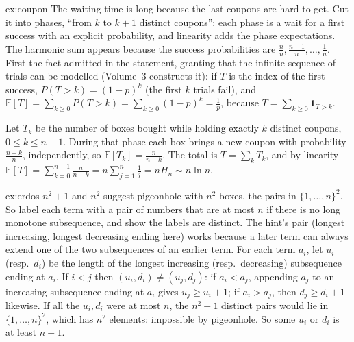 \begin{solution}{ex:coupon}
\idea The waiting time is long because the last coupons are hard to get. Cut it into phases, ``from $k$ to $k+1$ distinct coupons'': each phase is a wait for a first success with an explicit probability, and linearity adds the phase expectations. The harmonic sum appears because the success probabilities are $\frac nn,\frac{n-1}n,\dots,\frac1n$.
\writeup First the fact admitted in the statement, granting that the infinite sequence of trials can be modelled (Volume~3 constructs it): if $T$ is the index of the first success, $P(T>k)=(1-p)^k$ (the first $k$ trials fail), and $\mathbb E[T]=\sum_{k\ge0}P(T>k)=\sum_{k\ge0}(1-p)^k=\frac1p$, because $T=\sum_{k\ge0}\mathbf 1_{T>k}$.

Let $T_k$ be the number of boxes bought while holding exactly $k$ distinct coupons, $0\le k\le n-1$. During that phase each box brings a new coupon with probability $\frac{n-k}n$,
independently, so $\mathbb E[T_k]=\frac n{n-k}$. The total is $T=\sum_kT_k$, and by linearity
$\mathbb E[T]=\sum_{k=0}^{n-1}\frac n{n-k}=n\sum_{j=1}^n\frac1j=nH_n\sim n\ln n$.
\end{solution}

\begin{solution}{ex:erdos}
\idea $n^2+1$ and $n^2$ suggest pigeonhole with $n^2$ boxes, the pairs in $\{1,\dots,n\}^2$. So label each term with a pair of numbers that are at most $n$ if there is no long monotone subsequence, and show the labels are distinct. The hint's pair (longest increasing, longest decreasing ending here) works because a later term can always extend one of the two subsequences of an earlier term.
\writeup For each term $a_i$, let $u_i$ (resp.\ $d_i$) be the length of the longest increasing (resp.\ decreasing) subsequence ending at $a_i$. If $i<j$ then $(u_i,d_i)\ne(u_j,d_j)$:
if $a_i<a_j$, appending $a_j$ to an increasing subsequence ending at $a_i$ gives $u_j\ge u_i+1$; if $a_i>a_j$, then $d_j\ge d_i+1$ likewise. If all the $u_i,d_i$ were at most $n$, the $n^2+1$ distinct pairs would lie in
$\{1,\dots,n\}^2$, which has $n^2$ elements: impossible by pigeonhole. So some $u_i$ or $d_i$ is at least $n+1$.
\end{solution}


